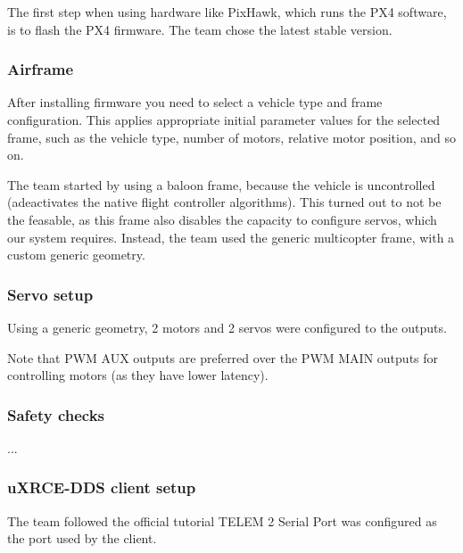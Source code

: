 \documentclass[a4paper]{article}
\begin{document}
The first step when using hardware like PixHawk, which runs the PX4 software, is to flash the PX4 firmware. 
The team chose the latest stable version. 

\subsubsection{Airframe}

After installing firmware you need to select a vehicle type and frame configuration. 
This applies appropriate initial parameter values for the selected frame, such as the vehicle type, number of motors, relative motor position, and so on. 

The team started by using a baloon frame, because the vehicle is uncontrolled (adeactivates the native flight controller algorithms). 
This turned out to not be the feasable, as this frame also disables the capacity to configure servos, which our system requires. 
Instead, the team used the generic multicopter frame, with a custom generic geometry. 

\subsubsection{Servo setup}

Using a generic geometry, 2 motors and 2 servos were configured to the outputs. 

Note that PWM AUX outputs are preferred over the PWM MAIN outputs for controlling motors (as they have lower latency). 

\subsubsection{Safety checks}

...

\subsubsection{uXRCE-DDS client setup}

The team followed the official tutorial 
TELEM 2 Serial Port was configured as the port used by the client. 

\end{document}
